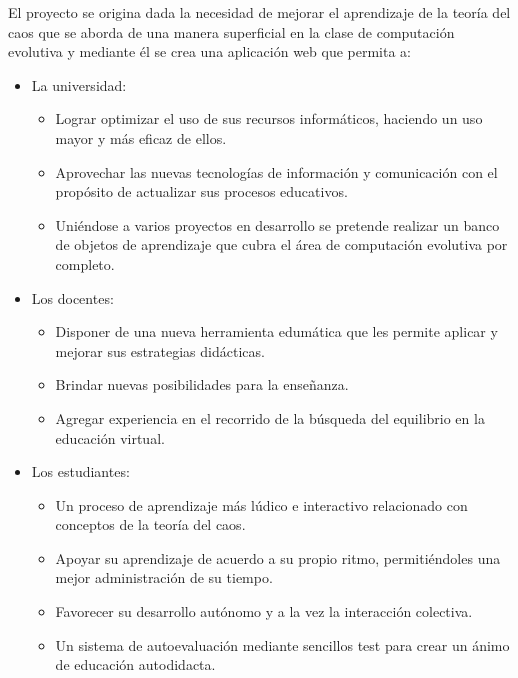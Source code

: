 \documentclass[letterpaper, 11pt, oneside]{article}
\theoremstyle{definition}
\theoremstyle{remark}
\begin{document}
El proyecto se origina dada la necesidad de mejorar el aprendizaje de la teoría del caos que se aborda de una manera superficial en la clase de computación evolutiva y mediante él se crea una aplicación web que permita a:

\begin{itemize}
\item La universidad:
  \begin{itemize}    
  \item Lograr optimizar el uso de sus recursos informáticos, haciendo un uso mayor y más eficaz de ellos.
  \item Aprovechar las nuevas tecnologías de información y comunicación con el propósito de actualizar sus procesos educativos.  
  \item Uniéndose a varios proyectos en desarrollo se pretende realizar un banco de objetos de aprendizaje que cubra el área de computación evolutiva por completo.
  \end{itemize}
\item Los docentes:
  \begin{itemize}    
  \item Disponer de una nueva herramienta edumática que les permite aplicar y mejorar sus estrategias didácticas.
  \item Brindar nuevas posibilidades para la enseñanza.
  \item Agregar experiencia en el recorrido de la búsqueda del equilibrio en la educación virtual.

  \end{itemize}
\item Los estudiantes:
  \begin{itemize}    
  \item Un proceso de aprendizaje más lúdico e interactivo relacionado con conceptos de la teoría del caos.
  \item Apoyar su aprendizaje de acuerdo a su propio ritmo, permitiéndoles una mejor administración de su tiempo.
  \item Favorecer su desarrollo autónomo y a la vez la interacción colectiva.
  \item Un sistema de autoevaluación mediante sencillos test para crear un ánimo de educación autodidacta.
  \end{itemize}
\end{itemize}
\clearpage
\end{document}
